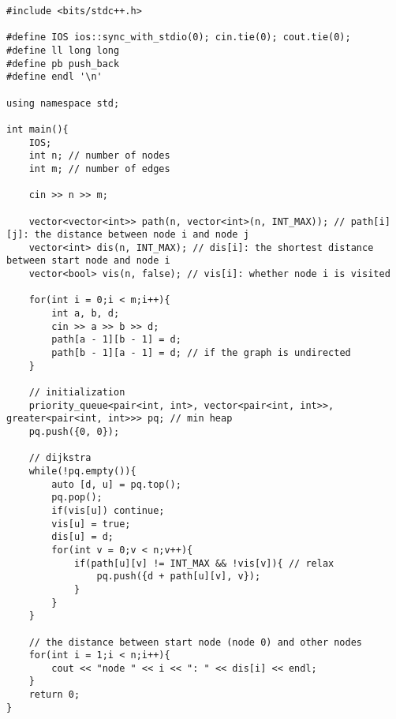 \documentclass[12pt, a4paper]{article}
\begin{document}
\begin{lstlisting}
#include <bits/stdc++.h>

#define IOS ios::sync_with_stdio(0); cin.tie(0); cout.tie(0);
#define ll long long
#define pb push_back
#define endl '\n'

using namespace std;

int main(){
    IOS;
    int n; // number of nodes
    int m; // number of edges

    cin >> n >> m;

    vector<vector<int>> path(n, vector<int>(n, INT_MAX)); // path[i][j]: the distance between node i and node j
    vector<int> dis(n, INT_MAX); // dis[i]: the shortest distance between start node and node i
    vector<bool> vis(n, false); // vis[i]: whether node i is visited

    for(int i = 0;i < m;i++){
        int a, b, d;
        cin >> a >> b >> d;
        path[a - 1][b - 1] = d;
        path[b - 1][a - 1] = d; // if the graph is undirected
    }

    // initialization
    priority_queue<pair<int, int>, vector<pair<int, int>>, greater<pair<int, int>>> pq; // min heap
    pq.push({0, 0});

    // dijkstra
    while(!pq.empty()){
        auto [d, u] = pq.top();
        pq.pop();
        if(vis[u]) continue;
        vis[u] = true;
        dis[u] = d;
        for(int v = 0;v < n;v++){
            if(path[u][v] != INT_MAX && !vis[v]){ // relax
                pq.push({d + path[u][v], v});
            }
        }
    }

    // the distance between start node (node 0) and other nodes
    for(int i = 1;i < n;i++){
        cout << "node " << i << ": " << dis[i] << endl;
    }
    return 0;
}
\end{lstlisting}
\end{document}
